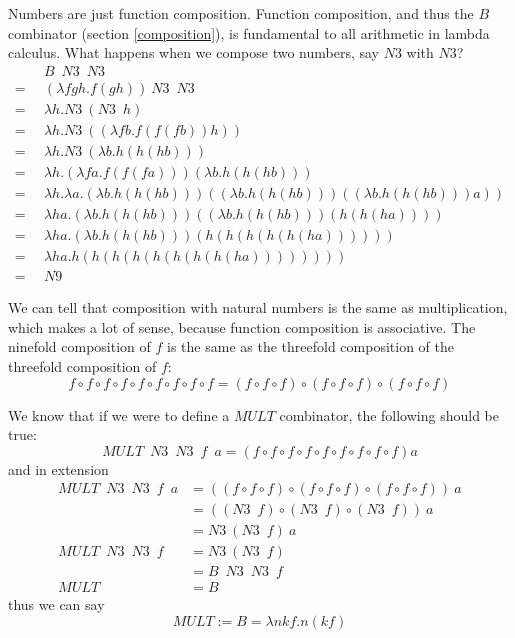 \documentclass[11pt]{article}
\begin{document}
Numbers are just function composition. Function composition, and thus the \(B\)
combinator (section \ref{composition}), is fundamental to all arithmetic in
lambda calculus. What happens when we compose two numbers, say \(N3\) with
\(N3\)?
\begin{align*}
	&\enspace B\enspace N3\enspace N3\\
	=&\enspace(\lambda fgh.f(gh))\:N3\enspace N3\\
	=&\enspace\lambda h.N3\:(N3\enspace h)\\
	=&\enspace\lambda h.N3\:((\lambda fb.f(f(fb))h))\\
	=&\enspace\lambda h.N3\:(\lambda b.h(h(hb)))\\
	=&\enspace\lambda h.(\lambda fa.f(f(fa)))(\lambda b.h(h(hb)))\\
	=&\enspace\lambda h.\lambda a.
		(\lambda b.h(h(hb)))((\lambda b.h(h(hb)))((\lambda b.h(h(hb)))a))\\
	=&\enspace\lambda ha.(\lambda b.h(h(hb)))((\lambda b.h(h(hb)))(h(h(ha))))\\
	=&\enspace\lambda ha.(\lambda b.h(h(hb)))(h(h(h(h(h(ha))))))\\
	=&\enspace\lambda ha.h(h(h(h(h(h(h(h(ha))))))))\\
	=&\enspace N9
\end{align*}

We can tell that composition with natural numbers is the same as
multiplication, which makes a lot of sense, because function composition is
associative. The ninefold composition of \(f\) is the same as the threefold
composition of the threefold composition of \(f\):
\[
	f\circ f\circ f\circ f\circ f\circ f\circ f\circ f\circ f
	= (f\circ f\circ f) \circ (f\circ f\circ f) \circ (f\circ f\circ f) 
\]

We know that if we were to define a \(MULT\) combinator, the following should
be true:
\[
	MULT\enspace N3\enspace N3\enspace f\enspace a
		=(f\circ f\circ f\circ f\circ f\circ f\circ f\circ f\circ f)a
\]
and in extension
\begin{align*}
	MULT\enspace N3\enspace N3\enspace f\enspace a
		&=((f\circ f\circ f)\circ(f\circ f\circ f)\circ(f\circ f\circ f))\:a\\
		&=((N3\enspace f)\circ (N3\enspace f)\circ (N3\enspace f))\:a\\
		&=N3\:(N3\enspace f)\:a\\
	MULT\enspace N3\enspace N3\enspace f\enspace
		&=N3\:(N3\enspace f)\\
		&=B\enspace N3\enspace N3\enspace f\\
	MULT&=B
\end{align*}
thus we can say
\[MULT:=B=\lambda nkf.n(kf)\]
\end{document}
